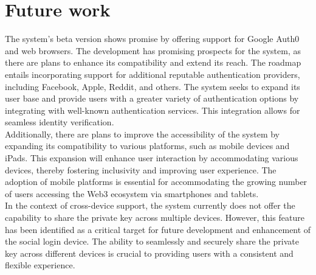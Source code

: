 \documentclass[../Main.tex]{subfiles}
\begin{document}
\section{Future work}
The system's beta version shows promise by offering support for Google Auth0 and web browsers. The development has promising prospects for the system, as there are plans to enhance its compatibility and extend its reach. The roadmap entails incorporating support for additional reputable authentication providers, including Facebook, Apple, Reddit, and others. The system seeks to expand its user base and provide users with a greater variety of authentication options by integrating with well-known authentication services. This integration allows for seamless identity verification.\\
\indent Additionally, there are plans to improve the accessibility of the system by expanding its compatibility to various platforms, such as mobile devices and iPads. This expansion will enhance user interaction by accommodating various devices, thereby fostering inclusivity and improving user experience. The adoption of mobile platforms is essential for accommodating the growing number of users accessing the Web3 ecosystem via smartphones and tablets.\\
\indent In the context of cross-device support, the system currently does not offer the capability to share the private key across multiple devices. However, this feature has been identified as a critical target for future development and enhancement of the social login device. The ability to seamlessly and securely share the private key across different devices is crucial to providing users with a consistent and flexible experience.



\label{section:6.2}
\end{document}
